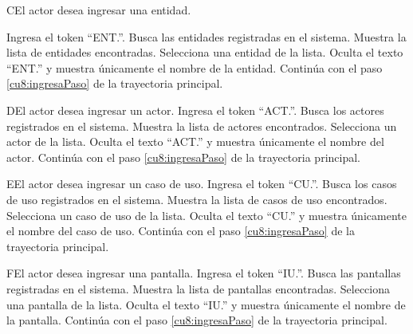  \begin{UCtrayectoriaA}{C}{El actor desea ingresar una entidad.}
 	
 	 \UCpaso[\UCactor] Ingresa el token ``ENT.''.
 	\UCpaso[\UCsist] Busca las entidades registradas en el sistema. 
 	\UCpaso[\UCsist] Muestra la lista de entidades encontradas.
 	\UCpaso[\UCactor] Selecciona una entidad de la lista.
  	\UCpaso[\UCsist] Oculta el texto ``ENT.'' y muestra únicamente el nombre de la entidad.
    \UCpaso[] Continúa con el paso \ref{cu8:ingresaPaso} de la trayectoria principal.
 \end{UCtrayectoriaA}
 
 \begin{UCtrayectoriaA}{D}{El actor desea ingresar un actor.}
 	\UCpaso[\UCactor] Ingresa el token ``ACT.''.
 	\UCpaso[\UCsist] Busca los actores registrados en el sistema. 
 	\UCpaso[\UCsist] Muestra la lista de actores encontrados.
 	\UCpaso[\UCactor] Selecciona un actor de la lista.
  	\UCpaso[\UCsist] Oculta el texto ``ACT.'' y muestra únicamente el nombre del actor.
    \UCpaso[] Continúa con el paso \ref{cu8:ingresaPaso} de la trayectoria principal.
 \end{UCtrayectoriaA}

 \begin{UCtrayectoriaA}{E}{El actor desea ingresar un caso de uso.}
  	\UCpaso[\UCactor] Ingresa el token ``CU.''.	
 	\UCpaso[\UCsist] Busca los casos de uso registrados en el sistema. 
 	\UCpaso[\UCsist] Muestra la lista de casos de uso encontrados.
 	\UCpaso[\UCactor] Selecciona un caso de uso de la lista.
  	\UCpaso[\UCsist] Oculta el texto ``CU.'' y muestra únicamente el nombre del caso de uso.
    \UCpaso[] Continúa con el paso \ref{cu8:ingresaPaso} de la trayectoria principal.
 \end{UCtrayectoriaA}

 \begin{UCtrayectoriaA}{F}{El actor desea ingresar una pantalla.}
 	\UCpaso[\UCactor] Ingresa el token ``IU.''.	
 	\UCpaso[\UCsist] Busca las pantallas registradas en el sistema. 
 	\UCpaso[\UCsist] Muestra la lista de pantallas encontradas.
 	\UCpaso[\UCactor] Selecciona una pantalla de la lista.
  	\UCpaso[\UCsist] Oculta el texto ``IU.'' y muestra únicamente el nombre de la pantalla.
    \UCpaso[] Continúa con el paso \ref{cu8:ingresaPaso} de la trayectoria principal.
 \end{UCtrayectoriaA}

